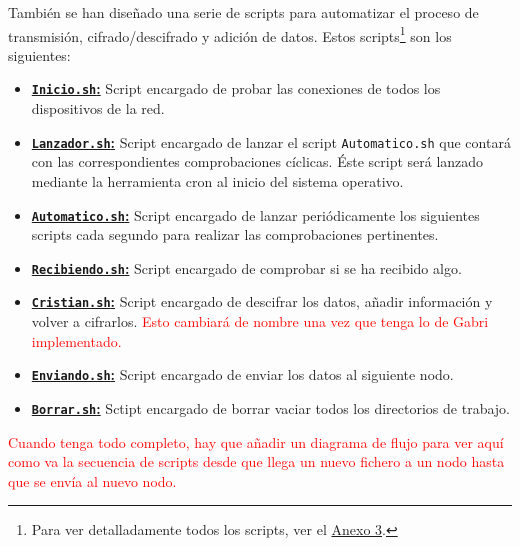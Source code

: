 También se han diseñado una serie de scripts para automatizar el proceso de transmisión, cifrado/descifrado y adición de datos. Estos scripts\footnote{Para ver detalladamente todos los scripts, ver el \hyperlink{Scripts}{Anexo 3}.} son los siguientes:
\begin{itemize}
	\item \hyperlink{ScriptConexion}{\textbf{\texttt{Inicio.sh}:}} Script encargado de probar las conexiones de todos los dispositivos de la red.
	\item \hyperlink{ScriptLanzador}{\textbf{\texttt{Lanzador.sh}:}} Script encargado de lanzar el script \texttt{Automatico.sh} que contará con las correspondientes comprobaciones cíclicas. Éste script será lanzado mediante la herramienta cron al inicio del sistema operativo.
	\item \hyperlink{ScriptAutomatico}{\textbf{\texttt{Automatico.sh}:}} Script encargado de lanzar periódicamente los siguientes scripts cada segundo para realizar las comprobaciones pertinentes.
	\item \hyperlink{ScriptRecibiendo}{\textbf{\texttt{Recibiendo.sh}:}} Script encargado de comprobar si se ha recibido algo.
	\item \hyperlink{ScriptCristian}{\textbf{\texttt{Cristian.sh}:}} Script encargado de descifrar los datos, añadir información y volver a cifrarlos. \textcolor{red}{Esto cambiará de nombre una vez que tenga lo de Gabri implementado.}
	\item \hyperlink{ScriptEnviando}{\textbf{\texttt{Enviando.sh}:}} Script encargado de enviar los datos al siguiente nodo.
	\item \hyperlink{ScriptBorrar}{\textbf{\texttt{Borrar.sh}:}} Sctipt encargado de borrar vaciar todos los directorios de trabajo.
\end{itemize}

\textcolor{red}{Cuando tenga todo completo, hay que añadir un diagrama de flujo para ver aquí como va la secuencia de scripts desde que llega un nuevo fichero a un nodo hasta que se envía al nuevo nodo.}
